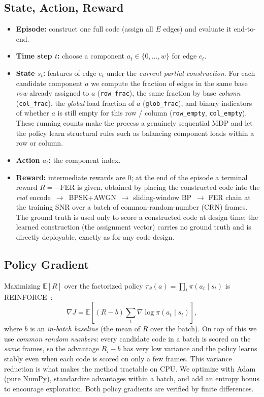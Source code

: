 \documentclass[journal]{IEEEtran}
\begin{document}
\subsection{State, Action, Reward}
\begin{itemize}
\item \textbf{Episode:} construct one full code (assign all $E$ edges) and
evaluate it end-to-end.
\item \textbf{Time step $t$:} choose a component $a_t \in \{0,\dots,w\}$ for
edge $e_t$.
\item \textbf{State $s_t$:} features of edge $e_t$ under the \emph{current
partial construction}. For each candidate component $a$ we compute the fraction
of edges in the same base \emph{row} already assigned to $a$ (\texttt{row\_frac}),
the same fraction by base \emph{column} (\texttt{col\_frac}), the \emph{global}
load fraction of $a$ (\texttt{glob\_frac}), and binary indicators of whether $a$
is still empty for this row / column (\texttt{row\_empty}, \texttt{col\_empty}).
These running counts make the process a genuinely sequential MDP and let the
policy learn structural rules such as balancing component loads within a row or
column.
\item \textbf{Action $a_t$:} the component index.
\item \textbf{Reward:} intermediate rewards are $0$; at the end of the episode
a terminal reward $R = -\text{FER}$ is given, obtained by placing the
constructed code into the \emph{real} encode~$\to$~BPSK+AWGN~$\to$
sliding-window BP~$\to$ FER chain at the training SNR over a batch of
common-random-number (CRN) frames. The ground truth is used only to score a
constructed code at design time; the learned construction (the assignment
vector) carries no ground truth and is directly deployable, exactly as for any
code design.
\end{itemize}

\subsection{Policy Gradient}
Maximizing $\mathbb{E}[R]$ over the factorized policy
$\pi_\theta(a) = \prod_t \pi(a_t \mid s_t)$ is
REINFORCE~\cite{williams1992reinforce,bello2016neural}:
\begin{equation}
\nabla J = \mathbb{E}\!\left[(R-b)\sum_t \nabla \log \pi(a_t\mid s_t)\right],
\end{equation}
where $b$ is an \emph{in-batch baseline} (the mean of $R$ over the batch). On top
of this we use \emph{common random numbers}: every candidate code in a batch is
scored on the \emph{same} frames, so the advantage $R_i-b$ has very low variance
and the policy learns stably even when each code is scored on only a few frames.
This variance reduction is what makes the method tractable on CPU. We optimize
with Adam (pure NumPy), standardize advantages within a batch, and add an entropy
bonus to encourage exploration. Both policy gradients are verified by finite
differences.
\end{document}
